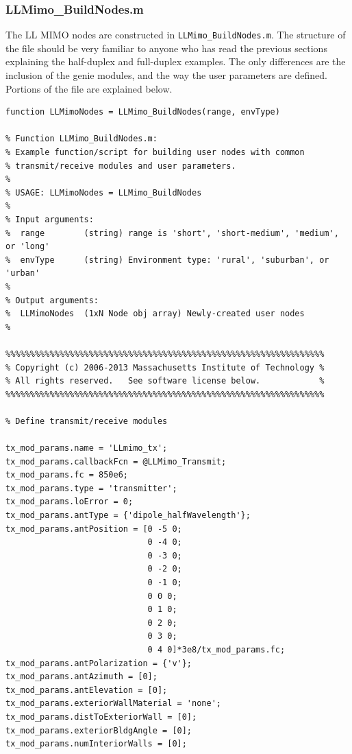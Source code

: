 \subsubsection{LLMimo\_BuildNodes.m}

The LL MIMO nodes are constructed in
\verb+LLMimo_BuildNodes.m+.  The structure of the file
should be very familiar to anyone who has read the previous sections
explaining the half-duplex and full-duplex examples.  The only
differences are the inclusion of the genie modules, and the way the
user parameters are defined.  Portions of the file are explained below.

\begin{lstlisting}[name=llmimoBuild]
function LLMimoNodes = LLMimo_BuildNodes(range, envType)

% Function LLMimo_BuildNodes.m:
% Example function/script for building user nodes with common
% transmit/receive modules and user parameters.
% 
% USAGE: LLMimoNodes = LLMimo_BuildNodes
%
% Input arguments:
%  range        (string) range is 'short', 'short-medium', 'medium', or 'long'
%  envType      (string) Environment type: 'rural', 'suburban', or 'urban'
%
% Output arguments:
%  LLMimoNodes  (1xN Node obj array) Newly-created user nodes
%

%%%%%%%%%%%%%%%%%%%%%%%%%%%%%%%%%%%%%%%%%%%%%%%%%%%%%%%%%%%%%%%%%
% Copyright (c) 2006-2013 Massachusetts Institute of Technology %
% All rights reserved.   See software license below.            %
%%%%%%%%%%%%%%%%%%%%%%%%%%%%%%%%%%%%%%%%%%%%%%%%%%%%%%%%%%%%%%%%%

% Define transmit/receive modules

tx_mod_params.name = 'LLmimo_tx';
tx_mod_params.callbackFcn = @LLMimo_Transmit;
tx_mod_params.fc = 850e6;
tx_mod_params.type = 'transmitter';
tx_mod_params.loError = 0;
tx_mod_params.antType = {'dipole_halfWavelength'};
tx_mod_params.antPosition = [0 -5 0;
                             0 -4 0;
                             0 -3 0;
                             0 -2 0;
                             0 -1 0;
                             0 0 0;
                             0 1 0;
                             0 2 0;
                             0 3 0;
                             0 4 0]*3e8/tx_mod_params.fc;
tx_mod_params.antPolarization = {'v'};
tx_mod_params.antAzimuth = [0];
tx_mod_params.antElevation = [0];
tx_mod_params.exteriorWallMaterial = 'none';
tx_mod_params.distToExteriorWall = [0];
tx_mod_params.exteriorBldgAngle = [0];
tx_mod_params.numInteriorWalls = [0];



\end{lstlisting}
